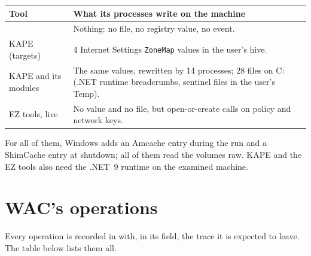 \documentclass[11pt,a4paper,oneside]{report}
\begin{document}
\begin{longtable}{@{}L{4.3cm}L{10.1cm}@{}}
\toprule
\bfseries Tool & \bfseries What its processes write on the machine \\
\midrule
\endhead
\wac{} & Nothing: no file, no registry value, no event. \\
KAPE (targets) & 4 Internet Settings \texttt{ZoneMap} values in the user's
  hive. \\
KAPE and its modules & The same values, rewritten by 14 processes; 28 files on
  C: (.NET runtime breadcrumbs, sentinel files in the user's Temp). \\
EZ tools, live & No value and no file, but open-or-create calls on policy and
  network keys. \\
\bottomrule
\end{longtable}

For all of them, Windows adds an Amcache entry during the run and a ShimCache
entry at shutdown; all of them read the volumes raw. KAPE and the EZ tools also
need the .NET~9 runtime on the examined machine.

\section{WAC's operations}

Every operation is recorded in  with, in its
 field, the trace it is expected to leave. The table below
lists them all.
\end{document}

